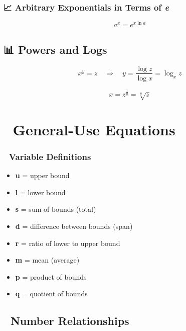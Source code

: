 \documentclass[
  letterpaper,
]{book}
\providecommand{\tightlist}{%
  \setlength{\itemsep}{0pt}\setlength{\parskip}{0pt}}
\begin{document}
\subsection{\texorpdfstring{📈 Arbitrary Exponentials in Terms of
\emph{e}}{📈 Arbitrary Exponentials in Terms of e}}\label{arbitrary-exponentials-in-terms-of-e}

\[
a^x = e^{x \ln a}
\]

\section{📊 Powers and Logs}\label{powers-and-logs}

\[
x^y = z \quad \Rightarrow \quad y = \frac{\log z}{\log x} = \log_x z
\]

\[
x = z^{\frac{1}{y}} = \sqrt[y]{z}
\]

\chapter{🧮 General-Use Equations}\label{general-use-equations}

\subsection{📘 Variable Definitions}\label{variable-definitions}

\begin{itemize}
\tightlist
\item
  \textbf{u} = upper bound\\
\item
  \textbf{l} = lower bound\\
\item
  \textbf{s} = sum of bounds (total)\\
\item
  \textbf{d} = difference between bounds (span)\\
\item
  \textbf{r} = ratio of lower to upper bound\\
\item
  \textbf{m} = mean (average)\\
\item
  \textbf{p} = product of bounds\\
\item
  \textbf{q} = quotient of bounds
\end{itemize}

\section{📏 Number Relationships}\label{number-relationships}
\end{document}
